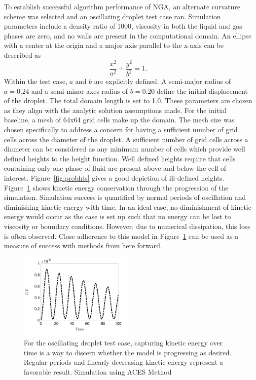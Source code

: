To establish successful algorithm performance of NGA, an alternate curvature scheme was selected and an oscillating droplet test case ran. Simulation parameters include a density ratio of 1000, viscosity in both the liquid and gas phases are zero, and no walls are present in the computational domain. An ellipse with a center at the origin and a major axis parallel to the x-axis can be described as 
\begin{equation}
\frac{x^2}{a^2} + \frac{y^2}{b^2} =1.
\end{equation}  
Within the test case, $a$ and $b$ are explicitly defined. A semi-major radius of $a=0.24$ and a semi-minor axes radius of $b=0.20$ define the initial displacement of the droplet. The total domain length is set to 1.0. These parameters are chosen as they align with the analytic solution assumptions made. For the initial baseline, a mesh of 64x64 grid cells make up the domain. The mesh size was chosen specifically to address a concern for having a sufficient number of grid cells across the diameter of the droplet. A sufficient number of grid cells across a diameter can be considered as any minimum number of cells which provide well defined heights to the height function. Well defined heights require that cells containing only one phase of fluid are present above and below the cell of interest. Figure~\ref{fig:probhts} gives a good depiction of ill-defined heights. Figure~\ref{fig:acesKE} shows kinetic energy conservation through the progression of the simulation. Simulation success is quantified by normal periods of oscillation and diminishing kinetic energy with time. In an ideal case, no diminishment of kinetic energy would occur as the case is set up such that no energy can be lost to viscosity or boundary conditions. However, due to numerical dissipation, this loss is often observed. Close adherence to this model in Figure~\ref{fig:acesKE} can be used as a measure of success with methods from here forward.
\begin{figure}[htpb]
	\centering
	\includegraphics[width=0.5\textwidth]{figs/ACES_KEplot.png}
	\caption{For the oscillating droplet test case, capturing kinetic energy over time is a way to discern whether the model is progressing as desired. Regular periods and linearly decreasing kinetic energy represent a favorable result. Simulation using ACES Method~\cite{Owkes2018}}
	\label{fig:acesKE}
\end{figure}
